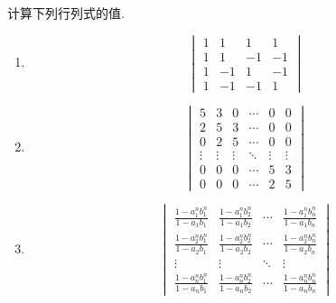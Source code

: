 \documentclass{ctexart}
\begin{document}
\pagestyle{empty}
\begin{center}
\end{center}
\begin{homework}[1(20')]
    计算下列行列式的值.
    \begin{enumerate}[label=\tbf{(\arabic*)},topsep=0pt,parsep=0pt,itemsep=0pt,partopsep=0pt]
        \item \[\begin{vmatrix}
            1&1&1&1\\
            1&1&-1&-1\\
            1&-1&1&-1\\
            1&-1&-1&1
        \end{vmatrix}\]
        \item \[\begin{vmatrix}
            5&3&0&\cdots&0&0\\
            2&5&3&\cdots&0&0\\
            0&2&5&\cdots&0&0\\
            \vdots&\vdots&\vdots&\ddots&\vdots&\vdots\\
            0&0&0&\cdots&5&3\\
            0&0&0&\cdots&2&5
        \end{vmatrix}\]
        \item \[\begin{vmatrix}
            \frac{1-a_1^nb_1^n}{1-a_1b_1}&\frac{1-a_1^nb_2^n}{1-a_1b_2}&\cdots&\frac{1-a_1^nb_n^n}{1-a_1b_n}\\
            \frac{1-a_2^nb_1^n}{1-a_2b_1}&\frac{1-a_2^nb_2^n}{1-a_2b_2}&\cdots&\frac{1-a_2^nb_n^n}{1-a_2b_n}\\
            \vdots&\vdots&\ddots&\vdots\\
            \frac{1-a_n^nb_1^n}{1-a_nb_1}&\frac{1-a_n^nb_2^n}{1-a_nb_2}&\cdots&\frac{1-a_n^nb_n^n}{1-a_nb_n}
        \end{vmatrix}\]
    \end{enumerate}
\end{homework}
\end{document}
